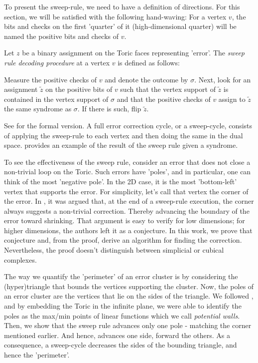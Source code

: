 To present the sweep-rule, we need to have a definition of directions. For this section, we will be satisfied with the following hand-waving: For a vertex $v$, the bits and checks on the first 'quarter' of it (high-dimensional quarter) will be named the positive bits and checks of $v$.
\begin{definition}
  Let $z$ be a binary assignment on the Toric faces representing 'error'. The \textit{sweep rule decoding procedure} at a vertex $v$ is defined as follows:


Measure the positive checks of $v$ and denote the outcome by $\sigma$. Next, look for an assignment $\tilde{z}$ on the positive bits of $v$ such that the vertex support of $\tilde{z}$ is contained in the vertex support of $\sigma$ and that the positive checks of $v$ assign to $\tilde{z}$ the same syndrome as $\sigma$. If there is such, flip $\tilde{z}$.

\end{definition}
See  for the formal version. A full error correction cycle, or a sweep-cycle, consists of applying the sweep-rule to each vertex and then doing the same in the dual space.  provides an example of the result of the sweep rule given a syndrome.

To see the effectiveness of the sweep rule, consider an error that does not close a non-trivial loop on the Toric. Such errors have 'poles', and in particular, one can think of the most 'negative pole'. In the 2D case, it is the most 'bottom-left' vertex that supports the error. For simplicity, let's call that vertex the corner of the error. In \cite{Kubica_2019}, it was argued that, at the end of a sweep-rule execution, the corner always suggests a non-trivial correction. Thereby advancing the boundary of the error toward shrinking.
That argument is easy to verify for low dimensions; for higher dimensions, the authors left it as a conjecture. In this work, we prove that conjecture and, from the proof, derive an algorithm for finding the correction. Nevertheless, the proof doesn't distinguish between simplicial or cubical complexes. 






The way we quantify the 'perimeter' of an error cluster is by considering the (hyper)triangle that bounds the vertices supporting the cluster. Now, the poles of an error cluster are the vertices that lie on the sides of the triangle. We followed \cite{Berman}, and by embedding the Toric in the infinite plane, we were able to identify the poles as the max/min points of linear functions which we call \textit{potential walls}. Then, we show that the sweep rule advances only one pole - matching the corner mentioned earlier. And hence, advances one side, forward the others.
As a consequence, a sweep-cycle decreases the sides of the bounding triangle, and hence the 'perimeter'. 


